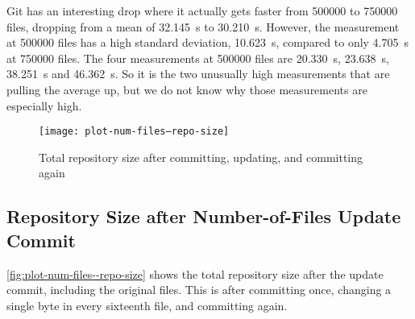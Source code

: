 

Git has an interesting drop where it actually gets faster from \num{500000}
to \num{750000} files, dropping from a mean of \SI{32.145}{\s} to
\SI{30.210}{\s}. However, the measurement at \num{500000} files has a high
standard deviation, \SI{10.623}{\s}, compared to only \SI{4.705}{\s} at
\num{750000} files. The four measurements at \num{500000} files are
\SI{20.330}{\s}, \SI{23.638}{\s}, \SI{38.251}{\s} and \SI{46.362}{\s}. So it is
the two unusually high measurements that are pulling the average up, but we do
not know why those measurements are especially high.

%


\begin{figure}[p]
    \caption{Total repository size after committing, updating, and committing
    again}
    \label{fig:plot-num-files--repo-size}
    \centering

    \explaindiskspaceplot

    \texttt{[image: plot-num-files--repo-size]}
\end{figure}

\cleardoublepage

\subsection{Repository Size after Number-of-Files Update\tweak{\\} Commit}

%


\autoref{fig:plot-num-files--repo-size} shows the total \gls{repository} size
after the update commit, including the original files. This is after committing
once, changing a single byte in every sixteenth file, and committing again.

